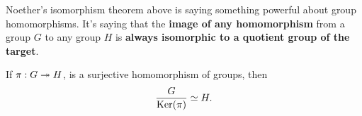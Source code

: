 \documentclass{ximera}
\begin{document}
Noether's isomorphism theorem above is saying something powerful about
group homomorphisms. It's saying that the \textbf{image of any
  homomorphism} from a group $G$ to any group $H$ is \textbf{always
  isomorphic to a quotient group of the target}.


\begin{corollary}
  If $\pi:G\twoheadrightarrow H$, is a surjective homomorphism of groups, then
  \[
  \frac{G}{\mathop{\mathrm{Ker}}\nolimits(\pi)} \simeq H.
  \]
\end{corollary}
\end{document}
